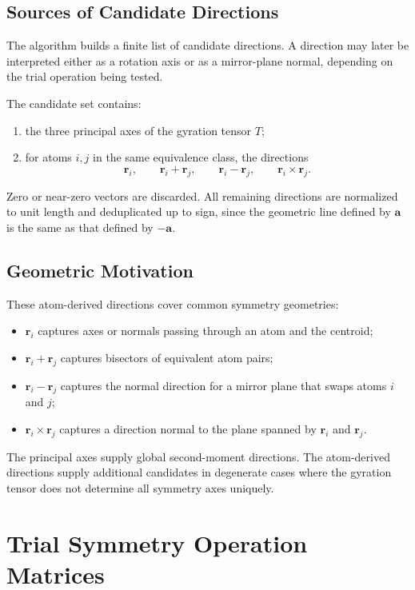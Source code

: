 \documentclass[11pt]{article}
\begin{document}
\subsection{Sources of Candidate Directions}

The algorithm builds a finite list of candidate directions.  A direction may
later be interpreted either as a rotation axis or as a mirror-plane normal,
depending on the trial operation being tested.

The candidate set contains:
\begin{enumerate}[label=(\alph*)]
    \item the three principal axes of the gyration tensor \(T\);
    \item for atoms \(i,j\) in the same equivalence class, the directions
    \[
        \mathbf r_i,\qquad
        \mathbf r_i+\mathbf r_j,\qquad
        \mathbf r_i-\mathbf r_j,\qquad
        \mathbf r_i\times\mathbf r_j.
    \]
\end{enumerate}
Zero or near-zero vectors are discarded.  All remaining directions are
normalized to unit length and deduplicated up to sign, since the geometric line
defined by \(\mathbf a\) is the same as that defined by \(-\mathbf a\).

\subsection{Geometric Motivation}

These atom-derived directions cover common symmetry geometries:
\begin{itemize}
    \item \(\mathbf r_i\) captures axes or normals passing through an atom and
    the centroid;
    \item \(\mathbf r_i+\mathbf r_j\) captures bisectors of equivalent atom
    pairs;
    \item \(\mathbf r_i-\mathbf r_j\) captures the normal direction for a mirror
    plane that swaps atoms \(i\) and \(j\);
    \item \(\mathbf r_i\times\mathbf r_j\) captures a direction normal to the
    plane spanned by \(\mathbf r_i\) and \(\mathbf r_j\).
\end{itemize}
The principal axes supply global second-moment directions.  The atom-derived
directions supply additional candidates in degenerate cases where the gyration
tensor does not determine all symmetry axes uniquely.

\section{Trial Symmetry Operation Matrices}
\end{document}
